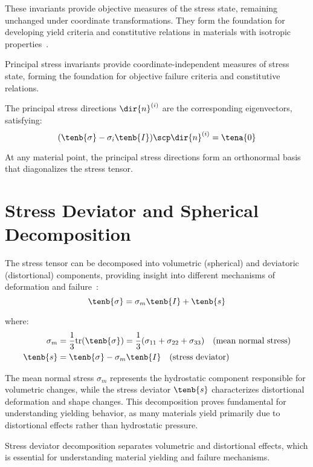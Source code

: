 These invariants provide objective measures of the stress state, remaining unchanged under coordinate transformations. They form the foundation for developing yield criteria and constitutive relations in materials with isotropic properties~\autocite{Sadd.2019}.

\begin{keypoint}
Principal stress invariants provide coordinate-independent measures of stress state, forming the foundation for objective failure criteria and constitutive relations.
\end{keypoint}

The principal stress directions $\dir{n}^{(i)}$ are the corresponding eigenvectors, satisfying:
\begin{equation}
(\tenb{\sigma} - \sigma_i \tenb{I}) \scp \dir{n}^{(i)} = \tena{0}
\end{equation}

At any material point, the principal stress directions form an orthonormal basis that diagonalizes the stress tensor.

\section{Stress Deviator and Spherical Decomposition}

The stress tensor can be decomposed into volumetric (spherical) and deviatoric (distortional) components, providing insight into different mechanisms of deformation and failure~\autocite{Sadd.2019}:
\begin{equation}
\tenb{\sigma} = \sigma_m \tenb{I} + \tenb{s}
\end{equation}

where:
\begin{align}
\sigma_m &= \frac{1}{3}\text{tr}(\tenb{\sigma}) = \frac{1}{3}(\sigma_{11} + \sigma_{22} + \sigma_{33}) \quad \text{(mean normal stress)}\\
\tenb{s} &= \tenb{\sigma} - \sigma_m \tenb{I} \quad \text{(stress deviator)}
\end{align}

The mean normal stress $\sigma_m$ represents the hydrostatic component responsible for volumetric changes, while the stress deviator $\tenb{s}$ characterizes distortional deformation and shape changes. This decomposition proves fundamental for understanding yielding behavior, as many materials yield primarily due to distortional effects rather than hydrostatic pressure.

\begin{keypoint}
Stress deviator decomposition separates volumetric and distortional effects, which is essential for understanding material yielding and failure mechanisms.
\end{keypoint}

